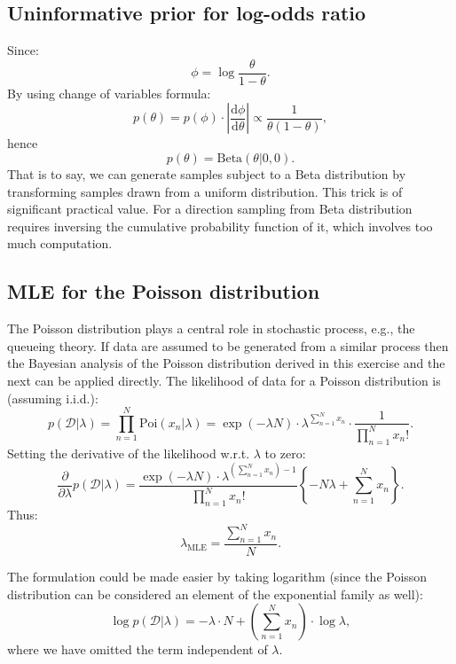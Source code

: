 \documentclass[UTF8]{ctexart}
\begin{document}
\subsection{Uninformative prior for log-odds ratio}
Since:
$$\phi=\log \frac{\theta}{1-\theta}.$$
By using change of variables formula:
$$p(\theta)=p(\phi)\cdot |\frac{\text{d}\phi}{\text{d}\theta}| \propto \frac{1}{\theta(1-\theta)},$$
hence
$$p(\theta)=\text{Beta}(\theta|0,0).$$
That is to say, we can generate samples subject to a Beta distribution by transforming samples drawn from a uniform distribution.
This trick is of significant practical value.
For a direction sampling from Beta distribution requires inversing the cumulative probability function of it, which involves too much computation.

\subsection{MLE for the Poisson distribution}
The Poisson distribution plays a central role in stochastic process, e.g., the queueing theory.
If data are assumed to be generated from a similar process then the Bayesian analysis of the Poisson distribution derived in this exercise and the next can be applied directly.
The likelihood of data for a Poisson distribution is (assuming i.i.d.):
$$p(\mathcal{D}|\lambda)=\prod_{n=1}^{N}\text{Poi}(x_{n}|\lambda) = \exp(-\lambda N)\cdot \lambda^{\sum_{n=1}^{N}x_{n}}\cdot\frac{1}{\prod_{n=1}^{N}x_{n}!}.$$
Setting the derivative of the likelihood w.r.t. $\lambda$ to zero:
$$\frac{\partial}{\partial \lambda}p(\mathcal{D}|\lambda) = \frac{\exp(-\lambda N)\cdot \lambda^{(\sum_{n=1}^{N} x_{n})- 1}}{\prod_{n=1}^{N}x_{n}!}\left\{ -N\lambda + \sum_{n=1}^{N}x_{n} \right\}.$$
Thus:
$$\lambda_{\text{MLE}} = \frac{\sum_{n=1}^{N}x_{n}}{N}.$$

The formulation could be made easier by taking logarithm (since the Poisson distribution can be considered an element of the exponential family as well):
$$\log p(\mathcal{D}|\lambda)=-\lambda\cdot N+\left(\sum_{n=1}^{N} x_{n}\right)\cdot \log \lambda,$$
where we have omitted the term independent of $\lambda$.
\end{document}

